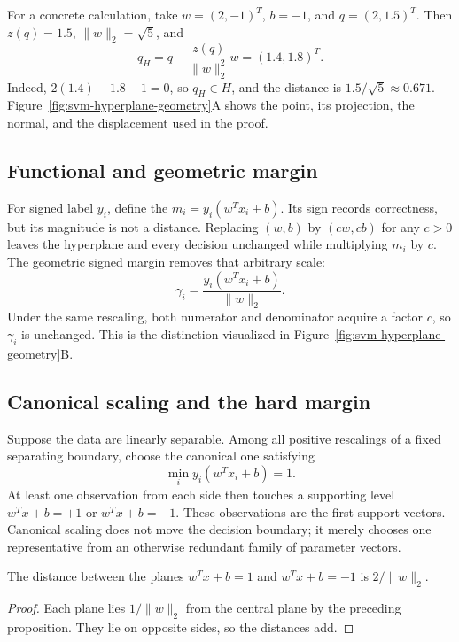For a concrete calculation, take $w=(2,-1)^T$, $b=-1$, and
$q=(2,1.5)^T$. Then $z(q)=1.5$, $\lVert w\rVert_2=\sqrt5$, and
\[
  q_H=q-\frac{z(q)}{\lVert w\rVert_2^2}w=(1.4,1.8)^T.
\]
Indeed, $2(1.4)-1.8-1=0$, so $q_H\in H$, and the distance is
$1.5/\sqrt5\approx0.671$. Figure~\ref{fig:svm-hyperplane-geometry}A shows
the point, its projection, the normal, and the displacement used in the proof.

\subsection{Functional and geometric margin}

For signed label $y_i$, define the 
$m_i=y_i(w^Tx_i+b)$. Its sign records correctness, but its magnitude is not a
distance. Replacing $(w,b)$ by $(cw,cb)$ for any $c>0$ leaves the hyperplane
and every decision unchanged while multiplying $m_i$ by $c$. The geometric
signed margin removes that arbitrary scale:
\[
  \gamma_i=\frac{y_i(w^Tx_i+b)}{\lVert w\rVert_2}.
\]
Under the same rescaling, both numerator and denominator acquire a factor
$c$, so $\gamma_i$ is unchanged. This is the distinction visualized in
Figure~\ref{fig:svm-hyperplane-geometry}B.

\subsection{Canonical scaling and the hard margin}

Suppose the data are linearly separable. Among all positive rescalings of a
fixed separating boundary, choose the canonical one satisfying
\[
  \min_i y_i(w^Tx_i+b)=1.
\]
At least one observation from each side then touches a supporting level
$w^Tx+b=+1$ or $w^Tx+b=-1$. These observations are the first support vectors.
Canonical scaling does not move the decision boundary; it merely chooses one
representative from an otherwise redundant family of parameter vectors.

\begin{proposition}
The distance between the planes $w^Tx+b=1$ and $w^Tx+b=-1$ is
$2/\lVert w\rVert_2$.
\end{proposition}

\begin{proof}
Each plane lies $1/\lVert w\rVert_2$ from the central plane by the preceding
proposition. They lie on opposite sides, so the distances add.
\end{proof}

